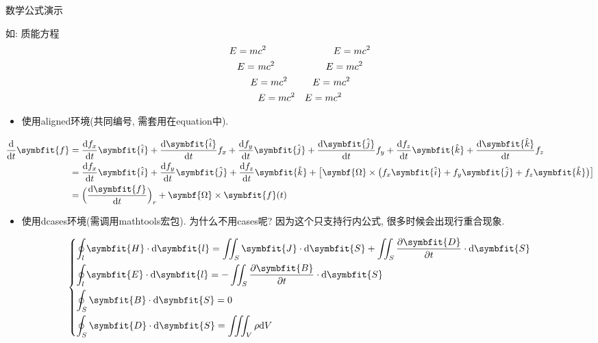 \documentclass[hyperref, UTF8, CJK, aspectratio=169]{beamer}
\begin{document}
\begin{frame}{数学公式演示}
\begin{itemize}
	\end{itemize}
	如: 质能方程
		\begin{align}
			E=m&c^2 & &E=mc^2\\
			E=~&mc^2 & E&=mc^2 \notag \\
			E&=mc^2 & E=~&mc^2\\
			&E=mc^2 & E=m&c^2
		\end{align}
	\begin{itemize}
		\item 使用aligned环境(共同编号, 需套用在equation中).
	\end{itemize}
		\begin{equation}
			\begin{aligned}
			\dfrac{\mathrm{d}}{\mathrm{d}t} \symbfit{f} &= \dfrac{\mathrm{d}f_x}{\mathrm{d}t} \symbfit{\hat{i}} + \dfrac{\mathrm{d}\symbfit{\hat{i}}}{\mathrm{d}t} f_x + \dfrac{\mathrm{d}f_y}{\mathrm{d}t} \symbfit{\hat{j}} + \dfrac{\mathrm{d}\symbfit{\hat{j}}}{\mathrm{d}t} f_y + \dfrac{\mathrm{d}f_z}{\mathrm{d}t} \symbfit{\hat{k}} + \dfrac{\mathrm{d}\symbfit{\hat{k}}}{\mathrm{d}t} f_z \\
			&= \dfrac{\mathrm{d}f_x}{\mathrm{d}t} \symbfit{\hat{i}} + \dfrac{\mathrm{d}f_y}{\mathrm{d}t} \symbfit{\hat{j}} + \dfrac{\mathrm{d}f_z}{\mathrm{d}t} \symbfit{\hat{k}} + \big[\symbf{\Omega} \times \big( f_x \symbfit{\hat{i}} + f_y \symbfit{\hat{j}} + f_z \symbfit{\hat{k}}\big) \big] \\
			&= \Big(\dfrac{\mathrm{d}\symbfit{f}}{\mathrm{d}t}\Big)_r + \symbf{\Omega} \times \symbfit{f}(t)
			\end{aligned}
		\end{equation}
	\begin{itemize}
		\item 使用dcases环境(需调用mathtools宏包). 为什么不用cases呢? 因为这个只支持行内公式, 很多时候会出现行重合现象.
	\end{itemize}
		\begin{equation}
			\begin{dcases}
			\oint_l \symbfit{H} \cdot \mathrm{d}\symbfit{l} = \iint_S \symbfit{J} \cdot \mathrm{d}\symbfit{S} + \iint_S \dfrac{\partial\symbfit{D}}{\partial t} \cdot \mathrm{d}\symbfit{S} \\
			\oint_l \symbfit{E} \cdot \mathrm{d}\symbfit{l} = - \iint_S \dfrac{\partial\symbfit{B}}{\partial t} \cdot \mathrm{d}\symbfit{S} \\
			\oint_S \symbfit{B} \cdot \mathrm{d}\symbfit{S} = 0 \\
			\oint_S \symbfit{D} \cdot \mathrm{d}\symbfit{S} = \iiint_V \rho \mathrm{d}V

\end{dcases}
\end{equation}
\end{frame}
\end{document}
